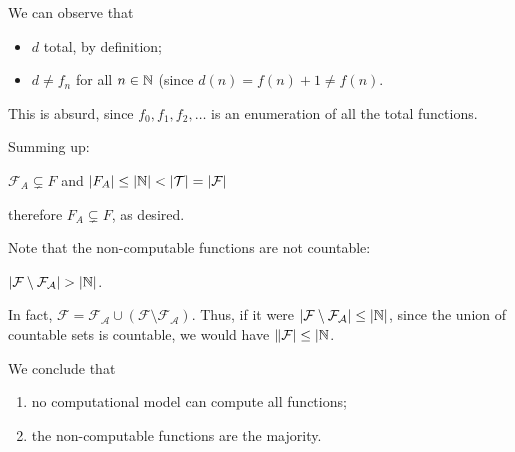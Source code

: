  We can observe that
  \begin{itemize}
  \item $d$ total, by definition;
  \item $d \neq f_n$ for all $n \in \mathbb{N}$ (since $d(n) = f(n)+1 \neq f(n)$.
  \end{itemize}
  This is absurd, since $f_0, f_1, f_2, \ldots$ is an enumeration of all the total functions.

  \medskip

  Summing up:
  \begin{center}
    $\mathcal{F}_A \subsetneq F$ and
    $|F_A| \leq |\mathbb{N}| < |\mathcal{T}| = |\mathcal{F}|$
  \end{center}
  therefore $F_A \subsetneq F$, as desired.

  Note that the non-computable functions are not countable:
  \begin{center}
    $|\mathcal{F} \setminus \mathcal{F}_{\mathcal{A}}| > |\mathbb{N}|$.
  \end{center}
  In fact, $\mathcal{F} = \mathcal{F}_{\mathcal{A}} \cup (\mathcal{F} \setminus \mathcal{F}_{\mathcal{A}})$. Thus, if it were $|\mathcal{F} \setminus \mathcal{F}_{\mathcal{A}}| \leq |\mathbb{N}|$, since the union of countable sets is countable, we would have $\|\mathcal{F}| \leq |\mathbb{N}$.

  We conclude that
  \begin{enumerate}
  \item no computational model can compute all  functions;
  \item the non-computable functions are the majority.
  \end{enumerate}
